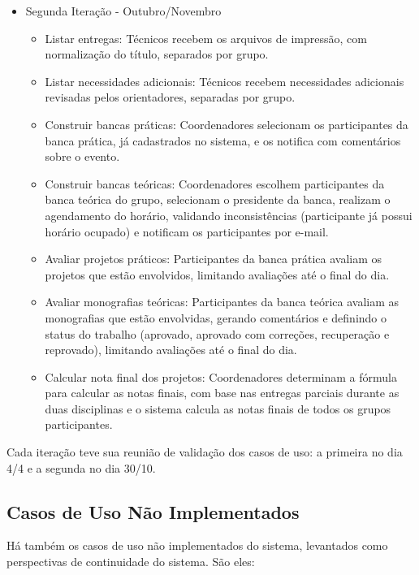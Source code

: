 \begin{itemize}
    \item Segunda Iteração - Outubro/Novembro
    \begin{itemize}
        \item Listar entregas: Técnicos recebem os arquivos de impressão, com normalização do título, separados por grupo.
        \item Listar necessidades adicionais: Técnicos recebem necessidades adicionais revisadas pelos orientadores, separadas por grupo.
        \item Construir bancas práticas: Coordenadores selecionam os participantes da banca prática, já cadastrados no sistema, e os notifica com comentários sobre o evento.
        \item Construir bancas teóricas: Coordenadores escolhem participantes da banca teórica do grupo, selecionam o presidente da banca, realizam o agendamento do horário, validando inconsistências (participante já possui horário ocupado) e notificam os participantes por e-mail.
        \item Avaliar projetos práticos: Participantes da banca prática avaliam os projetos que estão envolvidos, limitando avaliações até o final do dia.
        \item Avaliar monografias teóricas: Participantes da banca teórica avaliam as monografias que estão envolvidas, gerando comentários e definindo o status do trabalho (aprovado, aprovado com correções, recuperação e reprovado), limitando avaliações até o final do dia.
        \item Calcular nota final dos projetos: Coordenadores determinam a fórmula para calcular as notas finais, com base nas entregas parciais durante as duas disciplinas e o sistema calcula as notas finais de todos os grupos participantes.
    \end{itemize}
\end{itemize}

Cada iteração teve sua reunião de validação dos casos de uso: a primeira no dia 4/4 e a segunda no dia 30/10.

\subsection{Casos de Uso Não Implementados}
Há também os casos de uso não implementados do sistema, levantados como perspectivas de continuidade do sistema. São eles:

